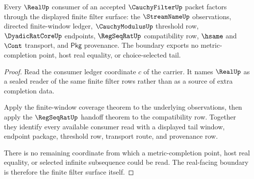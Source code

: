 \begin{theorem}\label{thm:cauchyfilter-real-seal-consumer-boundary}
Every $\RealUp$ consumer of an accepted $\CauchyFilterUp$ packet factors
through the displayed finite filter surface: the $\StreamNameUp$ observations,
directed finite-window ledger, $\CauchyModulusUp$ threshold row,
$\DyadicRatCoreUp$ endpoints, $\RegSeqRatUp$ compatibility row, $\hsame$ and
$\Cont$ transport, and $\mathsf{Pkg}$ provenance. The boundary exports no
metric-completion point, host real equality, or choice-selected tail.
\end{theorem}
\begin{proof}
Read the consumer ledger coordinate $c$ of the carrier. It names $\RealUp$ as
a sealed reader of the same finite filter rows rather than as a source of
extra completion data.

Apply the finite-window coverage theorem to the underlying observations, then
apply the $\RegSeqRatUp$ handoff theorem to the compatibility row. Together
they identify every available consumer read with a displayed tail window,
endpoint package, threshold row, transport route, and provenance row.

There is no remaining coordinate from which a metric-completion point, host
real equality, or selected infinite subsequence could be read. The real-facing
boundary is therefore the finite filter surface itself.
\end{proof}

